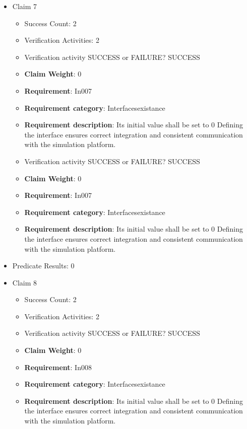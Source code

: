 \documentclass{article}
\begin{document}
\begin{itemize}
  				  \item Claim 7
				\begin{itemize}
			    	\item Success Count: 2 
			    	\item Verification Activities: 2
					\item Verification activity SUCCESS or FAILURE? SUCCESS
					\item \textbf{Claim Weight}: 0
						\item \textbf{Requirement}: In007 
						\item \textbf{Requirement category}: Interfacesexistance 
						\item \textbf{Requirement description}: Its initial value shall be set to 0 Defining the interface ensures correct integration and consistent communication with the simulation platform.
					
					\item Verification activity SUCCESS or FAILURE? SUCCESS
					\item \textbf{Claim Weight}: 0
						\item \textbf{Requirement}: In007 
						\item \textbf{Requirement category}: Interfacesexistance 
						\item \textbf{Requirement description}: Its initial value shall be set to 0 Defining the interface ensures correct integration and consistent communication with the simulation platform.
					
				\end{itemize}
				
									    
				\item Predicate Results: 0

  				  \item Claim 8
				\begin{itemize}
			    	\item Success Count: 2 
			    	\item Verification Activities: 2
					\item Verification activity SUCCESS or FAILURE? SUCCESS
					\item \textbf{Claim Weight}: 0
						\item \textbf{Requirement}: In008 
						\item \textbf{Requirement category}: Interfacesexistance 
						\item \textbf{Requirement description}: Its initial value shall be set to 0 Defining the interface ensures correct integration and consistent communication with the simulation platform.
					

\end{itemize}
\end{itemize}
\end{document}
